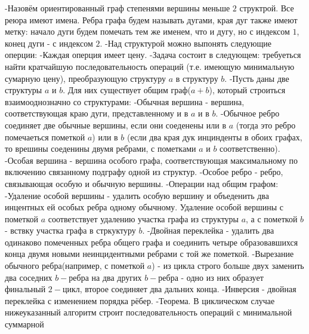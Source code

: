 \documentclass[a4paper,12pt]{article}
\begin{document}
-Назовём ориентированный граф степенями вершины меньше $2$ структрой. Все реюра имеют имена. Ребра графа будем
называть дугами, края дуг также имеют метку: начало дуги будем помечать тем же именем, что и дугу, но с индексом
$1$, конец дуги - с индексом $2$.\newline
-Над структурой можно выпонять следующие оперции:\newline
-Каждая оперция имеет цену.\newline
-Задача состоит в следующем: требуеться найти кратчайшую последовательность операций (т.е. имеющую минимальную
сумарную цену), преобразующую структуру $a$ в структуру $b$.\newline
-Пусть даны две структуры $a$ и $b$. Для них существует общим граф($a+b$), который строиться взаимооднозначно со
структурами:\newline
-Обычная вершина - вершина, соответствующая краю дуги, представленному и в $a$ и в $b$.
-Обычное ребро соединяет две обычные вершины, если они соеденены или в $a$ (тогда это ребро помечаеться пометкой
$a$) или в $b$ (если два края дук инцинденты в обоих графах, то врешины соеденины двумя ребрами, с пометками
$a$ и $b$ соответственно).\newline
-Особая вершина - вершина особого графа, соответствующая максимальному по включению связанному подграфу одной
из структур.\newline
-Особое ребро - ребро, связывающая особую и обычную вершины.\newline
-Операции над общим графом:\newline
 -Удаление особой вершины - удалить особую вершину и объеденить два инцентных ей особых ребра одному обычному.
Удаление особой вершины с пометкой $a$ соответствует удалению участка графа из структуры $a$, а с пометкой $b$ -
вствку участка графа в стркуктуру $b$.\newline
 -Двойная переклейка - удалить два одинаково помеченных ребра общего графа и соединить четыре образовавшихся
конца двумя новыми неинцидентными ребрами с той же пометкой.\newline
 -Вырезание обычного ребра(например, с пометкой $a$) - из цикла строго больше двух заменить два соседних
$b-$ребра на два других $b-$ребра - одно из них образует финальный $2-$цикл, второе соединяет два дальних
конца.\newline
 -Инверсия - двойная переклейка с изменением порядка рёбер.\newline
-Теорема. В циклическом случае нижеуказанный алгоритм строит последовательность операций с минимальной суммарной
\end{document}
